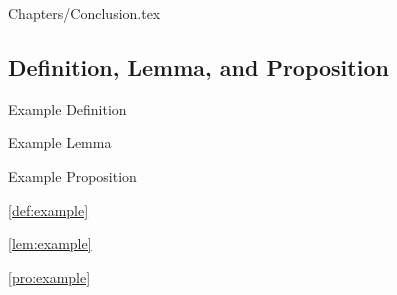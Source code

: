 
	{Chapters/Conclusion.tex} %


\subsection{Definition, Lemma, and Proposition}

\Definition\label{def:example} Example Definition

\Lemma\label{lem:example} Example Lemma

\Proposition\label{pro:example} Example Proposition

\ref{def:example}

\ref{lem:example}

\ref{pro:example}